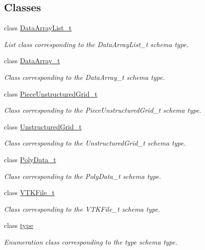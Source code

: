 \subsection*{Classes}
\begin{DoxyCompactItemize}
\item 
class \hyperlink{classDataArrayList__t}{Data\-Array\-List\-\_\-t}
\begin{DoxyCompactList}\small\item\em List class corresponding to the Data\-Array\-List\-\_\-t schema type. \end{DoxyCompactList}\item 
class \hyperlink{classDataArray__t}{Data\-Array\-\_\-t}
\begin{DoxyCompactList}\small\item\em Class corresponding to the Data\-Array\-\_\-t schema type. \end{DoxyCompactList}\item 
class \hyperlink{classPieceUnstructuredGrid__t}{Piece\-Unstructured\-Grid\-\_\-t}
\begin{DoxyCompactList}\small\item\em Class corresponding to the Piece\-Unstructured\-Grid\-\_\-t schema type. \end{DoxyCompactList}\item 
class \hyperlink{classUnstructuredGrid__t}{Unstructured\-Grid\-\_\-t}
\begin{DoxyCompactList}\small\item\em Class corresponding to the Unstructured\-Grid\-\_\-t schema type. \end{DoxyCompactList}\item 
class \hyperlink{classPolyData__t}{Poly\-Data\-\_\-t}
\begin{DoxyCompactList}\small\item\em Class corresponding to the Poly\-Data\-\_\-t schema type. \end{DoxyCompactList}\item 
class \hyperlink{classVTKFile__t}{V\-T\-K\-File\-\_\-t}
\begin{DoxyCompactList}\small\item\em Class corresponding to the V\-T\-K\-File\-\_\-t schema type. \end{DoxyCompactList}\item 
class \hyperlink{classtype}{type}
\begin{DoxyCompactList}\small\item\em Enumeration class corresponding to the type schema type. \end{DoxyCompactList}\item 

\end{DoxyCompactItemize}
